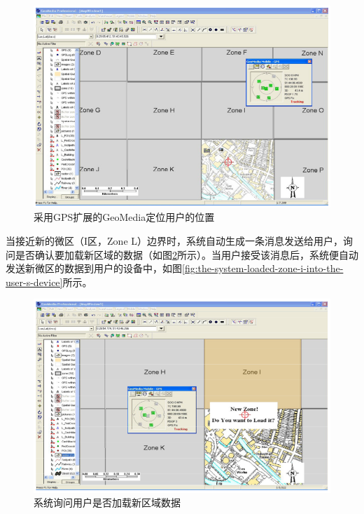 \documentclass{article}
\begin{document}
\begin{CJK}{UTF8}{gbsn}
	\begin{figure}[htbp]
		\centering
		\includegraphics[bb=0 0 738 501, scale=0.45]{figure/fig03.png}
		\caption{采用GPS扩展的GeoMedia定位用户的位置}
		\label{fig:geomedia-fixes-the-user-s-location-using-gps-expansion}
	\end{figure}

	当接近新的微区（I区，Zone L）边界时，系统自动生成一条消息发送给用户，询问是否确认要加载新区域的数据（如图\ref{fig:the-system-asking-the-user-to-load-the-new-zone}所示）。当用户接受该消息后，系统便自动发送新微区的数据到用户的设备中，如图\ref{fig:the-system-loaded-zone-i-into-the-user-s-device}所示。

	\begin{figure}[htbp]
		\centering
		\includegraphics[bb=0 0 740 482, scale=0.45]{figure/fig04.png}
		\caption{系统询问用户是否加载新区域数据}
		\label{fig:the-system-asking-the-user-to-load-the-new-zone}
	\end{figure}


\end{CJK}
\end{document}

